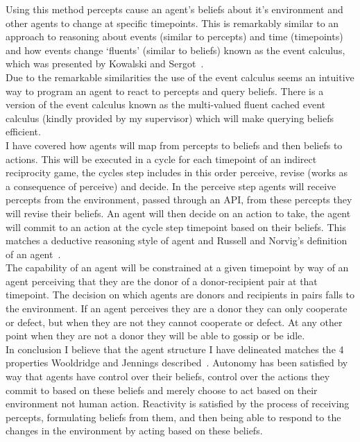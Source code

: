 \documentclass[twoside,twocolumn]{article}
\begin{document}
Using this method percepts cause an agent's beliefs about it's environment and other agents to change at specific timepoints. This is remarkably similar to an approach to reasoning about events (similar to percepts) and time (timepoints) and how events change `fluents' (similar to beliefs) known as the event calculus, which was presented by Kowalski and Sergot~\cite{kowalski1989logic}.\\
Due to the remarkable similarities the use of the event calculus seems an intuitive way to program an agent to react to percepts and query beliefs. There is a version of the event calculus known as the multi-valued fluent cached event calculus (kindly provided by my supervisor) which will make querying beliefs efficient.\\
I have covered how agents will map from percepts to beliefs and then beliefs to actions. This will be executed in a cycle for each timepoint of an indirect reciprocity game, the cycles step includes in this order perceive, revise (works as a consequence of perceive) and decide. In the perceive step agents will receive percepts from the environment, passed through an API, from these percepts they will revise their beliefs. An agent will then decide on an action to take, the agent will commit to an action at the cycle step timepoint based on their beliefs. This matches a deductive reasoning style of agent and Russell and Norvig's definition of an agent~\cite{russell2016artificial}.\\
The capability of an agent will be constrained at a given timepoint by way of an agent perceiving that they are the donor of a donor-recipient pair at that timepoint. The decision on which agents are donors and recipients in pairs falls to the environment. If an agent perceives they are a donor they can only cooperate or defect, but when they are not they cannot cooperate or defect. At any other point when they are not a donor they will be able to gossip or be idle.\\
In conclusion I believe that the agent structure I have delineated matches the 4 properties Wooldridge and Jennings described~\cite{wooldridge_jennings_1995}. Autonomy has been satisfied by way that agents have control over their beliefs, control over the actions they commit to based on these beliefs and merely choose to act based on their environment not human action. Reactivity is satisfied by the process of receiving percepts, formulating beliefs from them, and then being able to respond to the changes in the environment by acting based on these beliefs.\\
\end{document}
